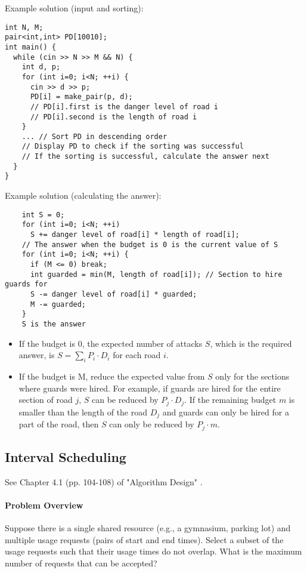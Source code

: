 Example solution (input and sorting):
\begin{cbox}
\begin{verbatim}
int N, M;
pair<int,int> PD[10010];
int main() {
  while (cin >> N >> M && N) {
    int d, p;
    for (int i=0; i<N; ++i) {
      cin >> d >> p;
      PD[i] = make_pair(p, d);
      // PD[i].first is the danger level of road i
      // PD[i].second is the length of road i
    }
    ... // Sort PD in descending order
    // Display PD to check if the sorting was successful
    // If the sorting is successful, calculate the answer next
  }
}
\end{verbatim}
\end{cbox}

Example solution (calculating the answer):
\begin{cbox}
\begin{verbatim}
    int S = 0;
    for (int i=0; i<N; ++i)
      S += danger level of road[i] * length of road[i];
    // The answer when the budget is 0 is the current value of S
    for (int i=0; i<N; ++i) {
      if (M <= 0) break;
      int guarded = min(M, length of road[i]); // Section to hire guards for
      S -= danger level of road[i] * guarded;
      M -= guarded;
    }
    S is the answer
\end{verbatim}
\end{cbox}

\begin{itemize}
    \item If the budget is 0, the expected number of attacks $S$, which is the required answer, is $S = \sum_i P_i \cdot D_i$ for each road $i$.
    \item If the budget is M, reduce the expected value from $S$ only for the sections where guards were hired. For example, if guards are hired for the entire section of road $j$, $S$ can be reduced by $P_j \cdot D_j$. If the remaining budget $m$ is smaller than the length of the road $D_j$ and guards can only be hired for a part of the road, then $S$ can only be reduced by $P_j \cdot m$.
\end{itemize}
\subsection{Interval Scheduling}

See Chapter 4.1 (pp. 104-108) of "Algorithm Design" \cite{book:algorithmdesign}.

\paragraph{Problem Overview}
Suppose there is a single shared resource (e.g., a gymnasium, parking lot) and multiple usage requests (pairs of start and end times). Select a subset of the usage requests such that their usage times do not overlap. What is the maximum number of requests that can be accepted?

